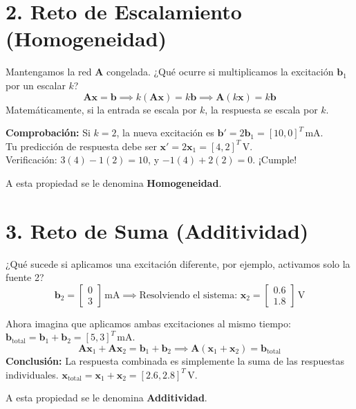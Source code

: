 \documentclass[11pt, a4paper]{article}
\begin{document}
\section*{2. Reto de Escalamiento (Homogeneidad)}
Mantengamos la red $\bm{A}$ congelada. ¿Qué ocurre si multiplicamos la excitación $\bm{b}_1$ por un escalar $k$?
\begin{equation*}
    \bm{A} \bm{x} = \bm{b} \implies k(\bm{A} \bm{x}) = k\bm{b} \implies \bm{A} (k\bm{x}) = k\bm{b}
\end{equation*}
Matemáticamente, si la entrada se escala por $k$, la respuesta se escala por $k$.

\textbf{Comprobación:} 
Si $k = 2$, la nueva excitación es $\bm{b}' = 2\bm{b}_1 = [10, 0]^T\,\text{mA}$. \\
Tu predicción de respuesta debe ser $\bm{x}' = 2\bm{x}_1 = [4, 2]^T\,\text{V}$. \\
Verificación: $3(4) - 1(2) = 10$, y $-1(4) + 2(2) = 0$. ¡Cumple!

A esta propiedad se le denomina \textbf{Homogeneidad}.

\section*{3. Reto de Suma (Additividad)}
¿Qué sucede si aplicamos una excitación diferente, por ejemplo, activamos solo la fuente 2?
\begin{equation*}
    \bm{b}_2 = \begin{bmatrix} 0 \\ 3 \end{bmatrix}\,\text{mA} \implies \text{Resolviendo el sistema: } \bm{x}_2 = \begin{bmatrix} 0.6 \\ 1.8 \end{bmatrix}\,\text{V}
\end{equation*}

Ahora imagina que aplicamos ambas excitaciones al mismo tiempo: $\bm{b}_{\text{total}} = \bm{b}_1 + \bm{b}_2 = [5, 3]^T\,\text{mA}$.
\begin{equation*}
    \bm{A} \bm{x}_1 + \bm{A} \bm{x}_2 = \bm{b}_1 + \bm{b}_2 \implies \bm{A} (\bm{x}_1 + \bm{x}_2) = \bm{b}_{\text{total}}
\end{equation*}
\textbf{Conclusión:} La respuesta combinada es simplemente la suma de las respuestas individuales.
$\bm{x}_{\text{total}} = \bm{x}_1 + \bm{x}_2 = [2.6, 2.8]^T\,\text{V}$.

A esta propiedad se le denomina \textbf{Additividad}.
\end{document}
